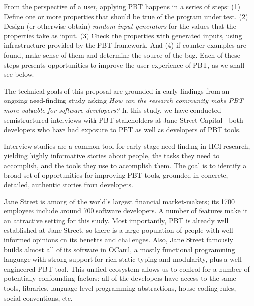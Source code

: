 From the perspective of a user, applying PBT happens in a series of steps:
(1) Define one or more properties that should be true of the program under
  test.
(2) Design (or otherwise obtain) {\em random input generators} for the
  values that the properties take as input.
(3) Check the properties with generated inputs, using infrastructure
  provided by the PBT framework.
And (4) if counter-examples are found, make sense of them and determine the
  source of the bug.
Each of these steps presents opportunities to improve the user experience of
PBT, as we shall see below.

\smallskip

 

\iflater{}
  \fi

\label{sec:motivation}
%
The technical goals of this proposal are grounded in early
findings from an ongoing need-finding study asking {\em How can the
  research community make PBT more valuable for software developers?}
%
\iflater {}\fi
%
%
In this study, we have conducted semistructured interviews with
PBT stakeholders at Jane
Street Capital---both
developers who have had exposure to PBT as
well as developers of PBT tools.

Interview
studies are a common tool for early-stage need finding in
HCI research, yielding highly informative stories about people, the tasks they need to
accomplish, and the tools they use to accomplish them. The goal
is to identify a broad set of opportunities for improving PBT tools,
grounded in concrete, detailed, authentic stories from developers.

Jane Street is among of the world's largest
financial market-makers; its 1700 employees
include around 700 software developers.  A number of features make
it an attractive setting for this study.  Most importantly, PBT is
already well established at Jane Street, so there is a large
population of people with well-informed opinions on its benefits and
challenges.  Also, Jane Street famously builds almost all of its
software in OCaml, a mostly functional programming language with
strong support for rich static typing and modularity, plus a well-engineered
PBT tool. This unified
ecosystem allows us to control for a number of potentially confounding
factors: all of the developers have access to the same tools,
libraries, language-level programming abstractions, house coding
rules, social conventions, etc.

